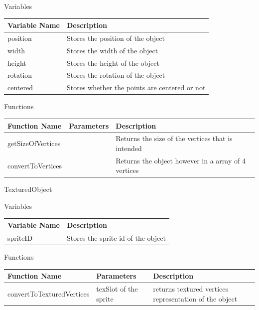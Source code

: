\documentclass{article}
\begin{document}
                \begin{center}
                    Variables
                    \begin{tabular}{ | m{} | m{} | }
                        \hline
                        \textbf{Variable Name} & \textbf{Description} \\
                        \hline
                        position & Stores the position of the object \\
                        \hline
                        width & Stores the width of the object \\
                        \hline
                        height & Stores the height of the object \\
                        \hline
                        rotation & Stores the rotation of the object \\
                        \hline
                        centered & Stores whether the points are centered or not \\
                        \hline
                    \end{tabular}
                    Functions
                    \begin{tabular}{ | m{} | m{}| m{} | }
                        \hline
                        \textbf{Function Name} & \textbf{Parameters} & \textbf{Description} \\
                        \hline
                        getSizeOfVertices & & Returns the size of the vertices that is intended \\
                        \hline
                        convertToVertices & & Returns the object however in a array of 4 vertices \\
                        \hline
                    \end{tabular}
                \end{center}
                TexturedObject
                \begin{center}
                    Variables
                    \begin{tabular}{ | m{} | m{} | }
                        \hline
                        \textbf{Variable Name} & \textbf{Description} \\
                        \hline
                        spriteID & Stores the sprite id of the object \\
                        \hline
                    \end{tabular}
                    Functions
                    \begin{tabular}{ | m{} | m{}| m{} | }
                        \hline
                        \textbf{Function Name} & \textbf{Parameters} & \textbf{Description} \\
                        \hline
                        convertToTexturedVertices & texSlot of the sprite & returns textured vertices representation of the object \\
                        \hline
                    \end{tabular}
                \end{center}
\end{document}
